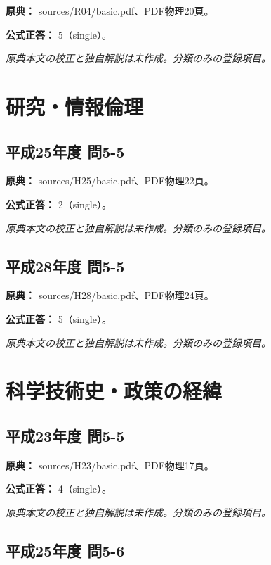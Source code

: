 \noindent\textbf{原典：} sources/R04/basic.pdf、PDF物理20頁。

\textbf{公式正答：} 5（single）。

\par\textit{原典本文の校正と独自解説は未作成。分類のみの登録項目。}

\section{研究・情報倫理}

\subsection{平成25年度 問5-5}
\label{q:h25-reg-basic-5-5}

\noindent\textbf{原典：} sources/H25/basic.pdf、PDF物理22頁。

\textbf{公式正答：} 2（single）。

\par\textit{原典本文の校正と独自解説は未作成。分類のみの登録項目。}

\subsection{平成28年度 問5-5}
\label{q:h28-reg-basic-5-5}

\noindent\textbf{原典：} sources/H28/basic.pdf、PDF物理24頁。

\textbf{公式正答：} 5（single）。

\par\textit{原典本文の校正と独自解説は未作成。分類のみの登録項目。}

\section{科学技術史・政策の経緯}

\subsection{平成23年度 問5-5}
\label{q:h23-reg-basic-5-5}

\noindent\textbf{原典：} sources/H23/basic.pdf、PDF物理17頁。

\textbf{公式正答：} 4（single）。

\par\textit{原典本文の校正と独自解説は未作成。分類のみの登録項目。}

\subsection{平成25年度 問5-6}
\label{q:h25-reg-basic-5-6}

